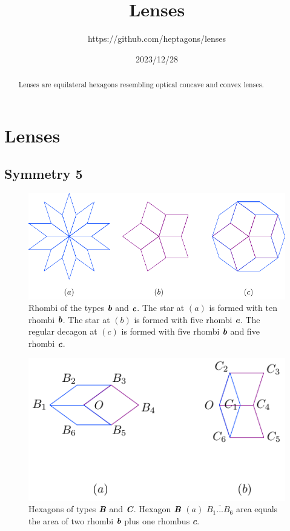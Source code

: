 \documentclass[11pt]{article}
\title{Lenses}
\author{https://github.com/heptagons/lenses}
\date{2023/12/28}
\def\mathbi#1{\textbf{\em #1}}
\begin{document}
\maketitle
\begin{abstract}
Lenses are equilateral hexagons resembling optical concave and convex lenses.
\end{abstract}

\section{Lenses}

\subsection{Symmetry 5}

\begin{figure}[h]
\centering
\includegraphics[scale=1.1]{bc/rhombi}
\caption{Rhombi of the types $\mathbi{b}$ and $\mathbi{c}$. The star at $(a)$ is formed with ten rhombi $\mathbi{b}$. The star at $(b)$ is formed with five rhombi $\mathbi{c}$. The regular decagon at $(c)$ is formed with five rhombi $\mathbi{b}$ and five rhombi $\mathbi{c}$.}
\label{fig:bc-rhombi}
\end{figure}

\begin{figure}[h]
\centering
\includegraphics[scale=1.1]{bc/hexagons}
\caption{Hexagons of types $\mathbi{B}$ and $\mathbi{C}$. Hexagon $\mathbi{B}$ $(a)$ $\overline{B_1...B_6}$ area equals the area of two rhombi $\mathbi{b}$ plus one rhombus \mathbi{c}.}
\label{fig:bc-hexagons}
\end{figure}
\end{document}
